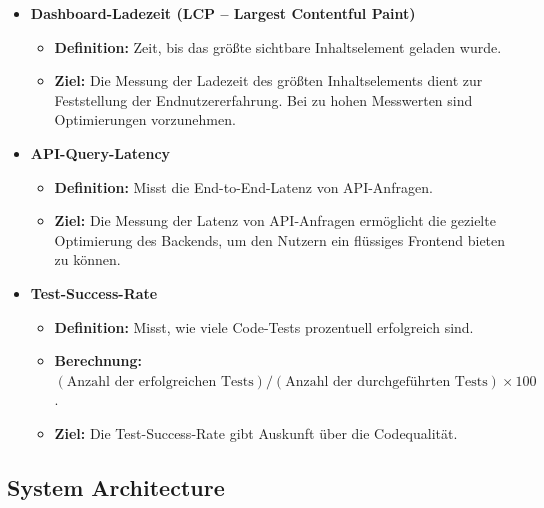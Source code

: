 \documentclass{article}
\begin{document}
\begin{itemize}
  \item \textbf{Dashboard-Ladezeit (LCP – Largest Contentful Paint)}
    \begin{itemize}
      \item \textbf{Definition:} Zeit, bis das größte sichtbare Inhaltselement geladen wurde.
      \item \textbf{Ziel:} Die Messung der Ladezeit des größten Inhaltselements dient zur Feststellung der Endnutzererfahrung. Bei zu hohen Messwerten sind Optimierungen vorzunehmen.
    \end{itemize}

  \item \textbf{API-Query-Latency}
    \begin{itemize}
      \item \textbf{Definition:} Misst die End-to-End-Latenz von API-Anfragen.
      \item \textbf{Ziel:} Die Messung der Latenz von API-Anfragen ermöglicht die gezielte Optimierung des Backends, um den Nutzern ein flüssiges Frontend bieten zu können.
    \end{itemize}

  \item \textbf{Test-Success-Rate}
    \begin{itemize}
      \item \textbf{Definition:} Misst, wie viele Code-Tests prozentuell erfolgreich sind.
      \item \textbf{Berechnung:} \((\text{Anzahl der erfolgreichen Tests}) / (\text{Anzahl der durchgeführten Tests}) \times 100\).
      \item \textbf{Ziel:} Die Test-Success-Rate gibt Auskunft über die Codequalität.
    \end{itemize}
\end{itemize}




\subsection{System Architecture}
\end{document}
